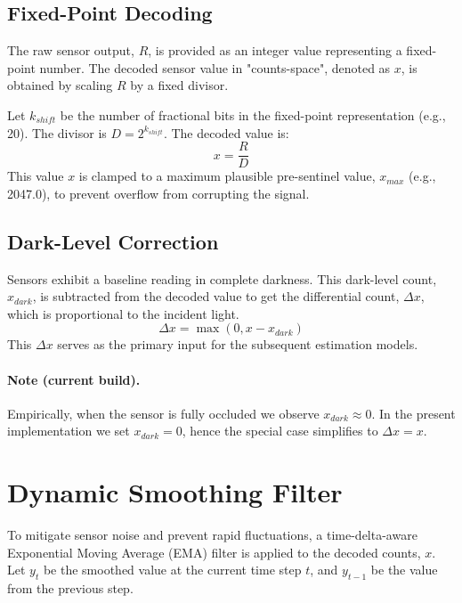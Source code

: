 \documentclass{article}
\begin{document}
\subsection{Fixed-Point Decoding}
The raw sensor output, $R$, is provided as an integer value representing a fixed-point number. The decoded sensor value in "counts-space", denoted as $x$, is obtained by scaling $R$ by a fixed divisor.

Let $k_{shift}$ be the number of fractional bits in the fixed-point representation (e.g., 20). The divisor is $D = 2^{k_{shift}}$. The decoded value is:
\begin{equation}
    x = \frac{R}{D}
\end{equation}
This value $x$ is clamped to a maximum plausible pre-sentinel value, $x_{max}$ (e.g., 2047.0), to prevent overflow from corrupting the signal.

\subsection{Dark-Level Correction}
Sensors exhibit a baseline reading in complete darkness. This dark-level count, $x_{dark}$, is subtracted from the decoded value to get the differential count, $\Delta x$, which is proportional to the incident light.
\begin{equation}
    \Delta x = \max(0, x - x_{dark})
\end{equation}
This $\Delta x$ serves as the primary input for the subsequent estimation models.

\paragraph{Note (current build).} Empirically, when the sensor is fully occluded we observe $x_{dark} \approx 0$. In the present implementation we set $x_{dark}=0$, hence the special case simplifies to $\Delta x = x$.

\section{Dynamic Smoothing Filter}
To mitigate sensor noise and prevent rapid fluctuations, a time-delta-aware Exponential Moving Average (EMA) filter is applied to the decoded counts, $x$. Let $y_t$ be the smoothed value at the current time step $t$, and $y_{t-1}$ be the value from the previous step.
\end{document}
